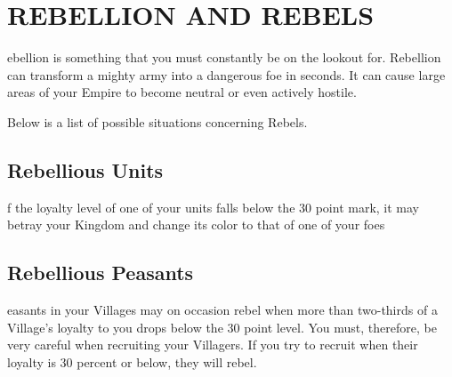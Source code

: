 
\chapter[Rebellion and Rebels]{\textsf{REBELLION AND REBELS}}

ebellion is something that you must constantly be on the lookout for. Rebellion can transform a mighty army into a dangerous foe in seconds. It can cause large areas of your Empire to become neutral or even actively hostile.

Below is a list of possible situations concerning Rebels.

\section{\textsf{Rebellious Units}}


f the loyalty level of one of your units falls below the 30 point mark, it may betray your Kingdom and change its color to that of one of your foes

\section{\textsf{Rebellious Peasants}}


easants in your Villages may on occasion rebel when more than two-thirds of a Village’s loyalty to you drops below the 30 point level. You must, therefore, be very careful when recruiting your Villagers. If you try to recruit when their loyalty is 30 percent or below, they will rebel.

